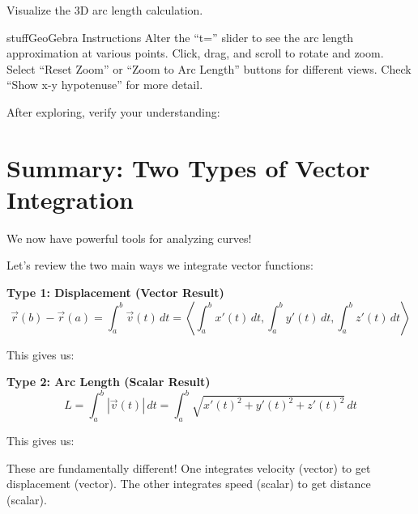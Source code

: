\documentclass{ximera}
\begin{document}
\begin{problem}
Visualize the 3D arc length calculation.

\begin{expandable}{stuff}{GeoGebra Instructions}
    Alter the ``t='' slider to see the arc length approximation at various points. Click, drag, and scroll to rotate and zoom. Select ``Reset Zoom'' or ``Zoom to Arc Length'' buttons for different views. Check ``Show x-y hypotenuse'' for more detail.
\end{expandable}

\begin{center}
\end{center}

After exploring, verify your understanding:
\begin{selectAll}
\end{selectAll}
\end{problem}

\section*{Summary: Two Types of Vector Integration}

We now have powerful tools for analyzing curves!

\begin{problem}
Let's review the two main ways we integrate vector functions:

\textbf{Type 1: Displacement (Vector Result)}
$$\vec{r}(b)-\vec{r}(a)= \int_a^b \vec{v}(t)\, dt=\left\langle \int_a^b x'(t)\, dt, \int_a^b y'(t)\, dt, \int_a^b z'(t)\, dt\right\rangle$$

This gives us:
\begin{multipleChoice}
\end{multipleChoice}

\textbf{Type 2: Arc Length (Scalar Result)}
$$L = \int_a^b |\vec{v}(t)|\, dt=\int_a^b\sqrt{x'(t)^2+y'(t)^2+z'(t)^2}\, dt$$

This gives us:
\begin{multipleChoice}
\end{multipleChoice}

\begin{feedback}
These are fundamentally different! One integrates velocity (vector) to get displacement (vector). The other integrates speed (scalar) to get distance (scalar).
\end{feedback}
\end{problem}
\end{document}
